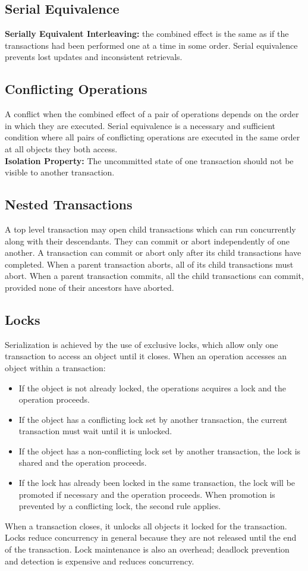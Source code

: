 \documentclass{math}
\begin{document}
\subsection*{Serial Equivalence}
\textbf{Serially Equivalent Interleaving:} the combined effect is the same as if
the transactions had been performed one at a time in some order. Serial
equivalence prevents lost updates and inconsistent retrievals.

\subsection*{Conflicting Operations}
A conflict when the combined effect of a pair of operations depends on the order
in which they are executed. Serial equivalence is a necessary and sufficient
condition where all pairs of conflicting operations are executed in the same
order at all objects they both access. \\
\textbf{Isolation Property:} The uncommitted state of one transaction should not
be visible to another transaction.

\subsection*{Nested Transactions}
A top level transaction may open child transactions which can run concurrently
along with their descendants. They can commit or abort independently of one
another. A transaction can commit or abort only after its child transactions
have completed. When a parent transaction aborts, all of its child transactions
must abort. When a parent transaction commits, all the child transactions can
commit, provided none of their ancestors have aborted.

\subsection*{Locks}
Serialization is achieved by the use of exclusive locks, which allow only one
transaction to access an object until it closes. When an operation accesses an
object within a transaction:
\begin{itemize}
  \item If the object is not already locked, the operations acquires a lock and
  the operation proceeds.
  \item If the object has a conflicting lock set by another transaction, the
  current transaction must wait until it is unlocked.
  \item If the object has a non-conflicting lock set by another transaction, the
  lock is shared and the operation proceeds.
  \item If the lock has already been locked in the same transaction, the lock
  will be promoted if necessary and the operation proceeds. When promotion is
  prevented by a conflicting lock, the second rule applies.
\end{itemize}
When a transaction closes, it unlocks all objects it locked for the transaction.
Locks reduce concurrency in general because they are not released until the end
of the transaction. Lock maintenance is also an overhead; deadlock prevention
and detection is expensive and reduces concurrency.
\end{document}
